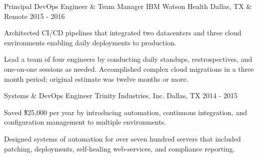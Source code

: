 \begin{cventries}
  \cventry
    {Principal DevOps Engineer \& Team Manager} %
    {IBM Watson Health} %
    {Dallas, TX \& Remote} %
    {2015 - 2016} %
    {
      \begin{cvitems} %
        \item {Architected CI/CD pipelines that integrated two datacenters and three cloud environments enabling daily deployments to production.}
        \item {Lead a team of four engineers by conducting daily standups, restrospectives, and one-on-one sessions as needed. Accomplished complex cloud migrations in a three month period; original estimate was twelve months or more.}
      \end{cvitems}
    }
    
  \cventry
    {Systems \& DevOps Engineer} %
    {Trinity Industries, Inc.} %
    {Dallas, TX} %
    {2014 - 2015} %
    {
      \begin{cvitems} %
        \item {Saved \~\$25,000 per year by introducing automation, continuous integration, and configuration management to multiple environments.}
        \item {Designed systems of automation for over seven hundred servers that included patching, deployments, self-healing web-services, and compliance reporting.}
      \end{cvitems}
    }

\end{cventries}